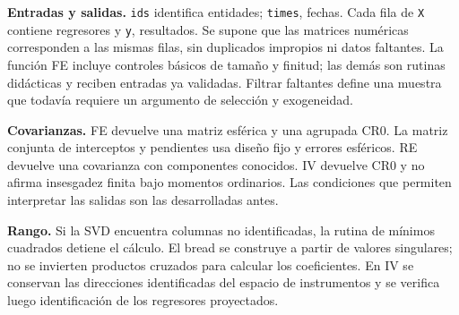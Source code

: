 \documentclass[11pt,a4paper]{article}
\theoremstyle{definition}
\begin{document}
\textbf{Entradas y salidas.} \texttt{ids} identifica entidades; \texttt{times}, fechas. Cada fila de \texttt{X} contiene regresores y \texttt{y}, resultados. Se supone que las matrices numéricas corresponden a las mismas filas, sin duplicados impropios ni datos faltantes. La función FE incluye controles básicos de tamaño y finitud; las demás son rutinas didácticas y reciben entradas ya validadas. Filtrar faltantes define una muestra que todavía requiere un argumento de selección y exogeneidad.

\textbf{Covarianzas.} FE devuelve una matriz esférica y una agrupada CR0. La matriz conjunta de interceptos y pendientes usa diseño fijo y errores esféricos. RE devuelve una covarianza con componentes conocidos. IV devuelve CR0 y no afirma insesgadez finita bajo momentos ordinarios. Las condiciones que permiten interpretar las salidas son las desarrolladas antes.

\textbf{Rango.} Si la SVD encuentra columnas no identificadas, la rutina de mínimos cuadrados detiene el cálculo. El bread se construye a partir de valores singulares; no se invierten productos cruzados para calcular los coeficientes. En IV se conservan las direcciones identificadas del espacio de instrumentos y se verifica luego identificación de los regresores proyectados.
\end{document}
